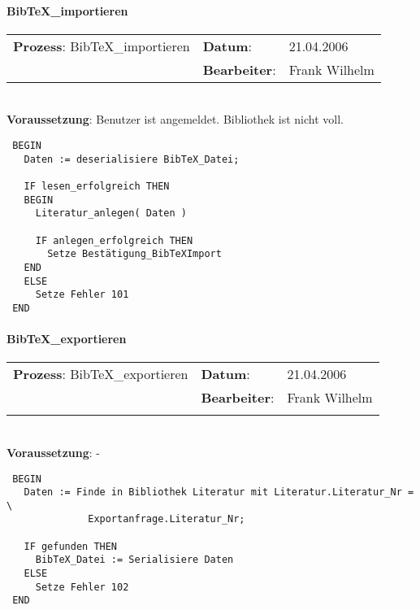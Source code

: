 \paragraph{BibTeX\_importieren}
\begin{tabular}[t]{p{9.5cm}ll}
\textbf{Prozess}: BibTeX\_importieren  	&\textbf{Datum}:      &21.04.2006\\
					&\textbf{Bearbeiter}: &Frank Wilhelm\\
\end{tabular}

\hrulefill\\
\textbf{Voraussetzung}: Benutzer ist angemeldet. Bibliothek ist nicht voll.
\begin{verbatim}
 BEGIN
   Daten := deserialisiere BibTeX_Datei;
   
   IF lesen_erfolgreich THEN
   BEGIN
     Literatur_anlegen( Daten )
     
     IF anlegen_erfolgreich THEN
       Setze Bestätigung_BibTeXImport
   END
   ELSE
     Setze Fehler 101
 END
\end{verbatim}
\hrulefill


\paragraph{BibTeX\_exportieren}
\begin{tabular}[t]{p{9.5cm}ll}
\textbf{Prozess}: BibTeX\_exportieren  	&\textbf{Datum}:      &21.04.2006\\
					&\textbf{Bearbeiter}: &Frank Wilhelm\\\\
\end{tabular}

\hrulefill\\
\textbf{Voraussetzung}: -
\begin{verbatim}
 BEGIN
   Daten := Finde in Bibliothek Literatur mit Literatur.Literatur_Nr = \
              Exportanfrage.Literatur_Nr;
  
   IF gefunden THEN
     BibTeX_Datei := Serialisiere Daten
   ELSE
     Setze Fehler 102
 END
\end{verbatim}

\hrulefill

